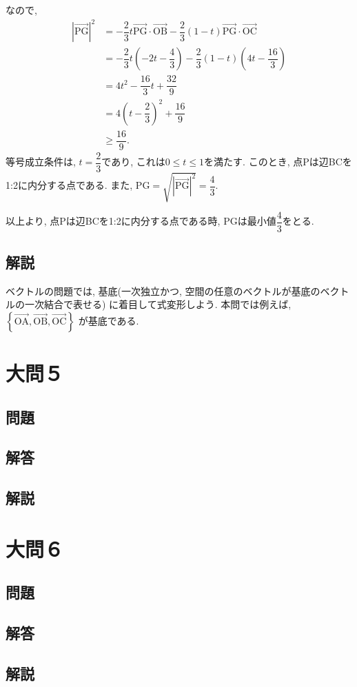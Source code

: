 \documentclass[dvipdfmx,a4paper]{jsarticle}
\newcommand{\oraw}{\overrightarrow}
\newcommand{\2}{I\hspace{-1pt}I}
\newcommand{\3}{I\hspace{-1pt}I\hspace{-1pt}I}
\begin{document}
\begin{itemize}
        なので, 
        \begin{align*}
            |\oraw{\mathrm{PG}}|^2 
            &= - \dfrac{2}{3}t \oraw{\mathrm{PG}} \cdot \oraw{\mathrm{OB}} - \dfrac{2}{3} (1-t) \oraw{\mathrm{PG}} \cdot \oraw{\mathrm{OC}} \\
            &= - \dfrac{2}{3}t \left(-2t - \dfrac{4}{3}\right) - \dfrac{2}{3} (1-t) \left(4t - \dfrac{16}{3}\right) \\
            &= 4t^2 - \dfrac{16}{3}t + \dfrac{32}{9} \\
            &= 4 \left(t- \dfrac{2}{3}\right)^2 + \dfrac{16}{9} \\
            &\geq \dfrac{16}{9}. 
        \end{align*}
        等号成立条件は, $t=\dfrac{2}{3}$であり, これは$0\leq t\leq 1$を満たす. 
        このとき, 点Pは辺BCを1:2に内分する点である. また, $\mathrm{PG} = \sqrt{|\oraw{\mathrm{PG}}|^2 } = \dfrac{4}{3}$. 

        以上より, 点Pは辺BCを1:2に内分する点である時, PGは最小値$\dfrac{4}{3}$をとる. 

    \end{itemize}
    
    \subsection{解説}
    ベクトルの問題では, 基底(一次独立かつ, 空間の任意のベクトルが基底のベクトルの一次結合で表せる)
    に着目して式変形しよう. 本問では例えば, $\left\{\oraw{\mathrm{OA}}, \oraw{\mathrm{OB}}, \oraw{\mathrm{OC}}\right\}$
    が基底である. 
    
    \section{大問５}
    \subsection{問題}

    \subsection{解答}

    \subsection{解説}

    \section{大問６}
    \subsection{問題}

    \subsection{解答}

    \subsection{解説}
\end{document}
